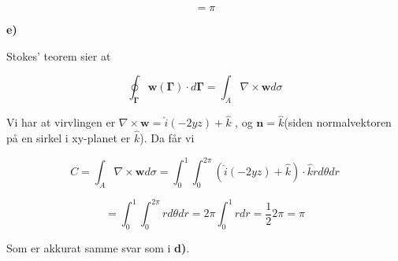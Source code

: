 \documentclass[a4paper,norsk,11pt,twoside]{article}
\begin{document}
$$
= \pi
$$

\textbf{e)}

Stokes' teorem sier at

$$
\oint_{\bm{\Gamma}} \bm{w}(\bm{\Gamma}) \cdot d\bm{\Gamma} = \int_A \nabla \times \textbf{w} d\sigma
$$

Vi har at virvlingen er $ \nabla \times \textbf{w} = \hat{i}(-2yz) + \hat{k}$ , og $\textbf{n} = \hat{k}$(siden normalvektoren på en sirkel i xy-planet er $\hat{k}$). Da får vi

$$
C = \int_A \nabla \times \textbf{w} d\sigma = \int_0^{1} \int_0^{2\pi}(\hat{i}(-2yz) + \hat{k})\cdot \hat{k} rd\theta dr 
$$

$$
= \int_0^{1} \int_0^{2\pi} rd\theta dr = 2\pi \int_0^{1} r dr = \frac{1}{2}2\pi = \pi
$$

Som er akkurat samme svar som i \textbf{d)}.
\end{document}
